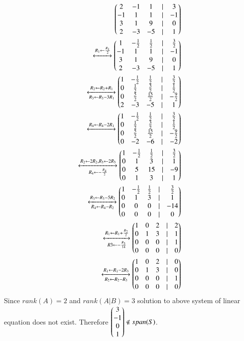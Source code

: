 \documentclass[journal,12pt,twocolumn]{IEEEtran}
\begin{document}
\begin{align}
	\begin{pmatrix}2 & -1 & 1  & | & 3 \\
	      -1 & 1 & 1  & | &-1 \\
	      3 & 1 & 9  & | & 0 \\
	      2 & -3 & -5 & |& 1\end{pmatrix}\\ 
	\xleftrightarrow[]{R_1 \leftarrow \frac{R_1}{2}}
	\begin{pmatrix}1 & -\frac{1}{2} & \frac{1}{2}& | &  \frac{3}{2} \\
	      -1 & 1 & 1  & | & -1 \\
	      3 & 1 & 9  & | & 0 \\
	      2 & -3 & -5  & | & 1\end{pmatrix}\\
	\xleftrightarrow[R_3 \leftarrow R_3 -3R_1]{R_2 \leftarrow R_2+R_1}
	\begin{pmatrix}1 & -\frac{1}{2} & \frac{1}{2}  & | & \frac{3}{2} \\
	      0 & \frac{1}{2} & \frac{3}{2}  & | & \frac{1}{2} \\
	      0 & \frac{5}{2} & \frac{15}{2}  & | & -\frac{9}{2} \\
	      2 & -3 & -5  & | & 1\end{pmatrix}\\ 
        \xleftrightarrow[]{R_4 \leftarrow R_4-2R_1}
	\begin{pmatrix}1 & -\frac{1}{2} & \frac{1}{2}  & | & \frac{3}{2} \\
	      0 & \frac{1}{2} & \frac{3}{2}  & | & \frac{1}{2} \\
	      0 & \frac{5}{2} & \frac{15}{2}  & | & -\frac{9}{2} \\
	      0 & -2 & -6 & | & -2\end{pmatrix}\\
	\xleftrightarrow[R_4 \leftarrow -\frac{R_4}{2}]{R_2 \leftarrow 2R_2, R_3 \leftarrow 2R_3}
	\begin{pmatrix}1 & -\frac{1}{2} & \frac{1}{2}  & | & \frac{3}{2} \\
	      0 & 1 & 3  & | & 1 \\
	      0 & 5 & 15  & | & -9 \\
	      0 & 1 & 3  & | & 1\end{pmatrix} \\
	\xleftrightarrow[R_4 \leftarrow R_4 - R_2]{R_3 \leftarrow R_3 - 5R_2}
	\begin{pmatrix}1 & -\frac{1}{2} & \frac{1}{2} & | & \frac{3}{2} \\
	      0 & 1 & 3 & | & 1 \\
	      0 & 0 & 0 & | & -14 \\
	      0 & 0 & 0 & | & 0\end{pmatrix} \\
 	\xleftrightarrow[R3 \leftarrow -\frac{R_3}{14} ]{R_1 \leftarrow R_1 + \frac{R_2}{2}}
	\begin{pmatrix}1 & 0  & 2 & | & 2 \\
	      0 & 1 & 3 & | & 1 \\
	      0 & 0 & 0 & | & 1 \\
	      0 & 0 & 0 & | & 0\end{pmatrix}\\
	\xleftrightarrow[R_2 \leftarrow R_2 - R_3]{R_1 \leftarrow R_1-2R_3}
	\begin{pmatrix}1 & 0  & 2 & | & 0 \\
	      0 & 1 & 3 & | & 0 \\
	      0 & 0 & 0 & | & 1 \\
	      0 & 0 & 0 & | & 0\end{pmatrix}
\end{align}
Since $rank(A)=2$ and $rank(A|B)=3$ solution to above system of linear equation does not exist.
Therefore $\begin{pmatrix}3\\-1\\0\\1\end{pmatrix} \notin span(S)$.
\end{document}
